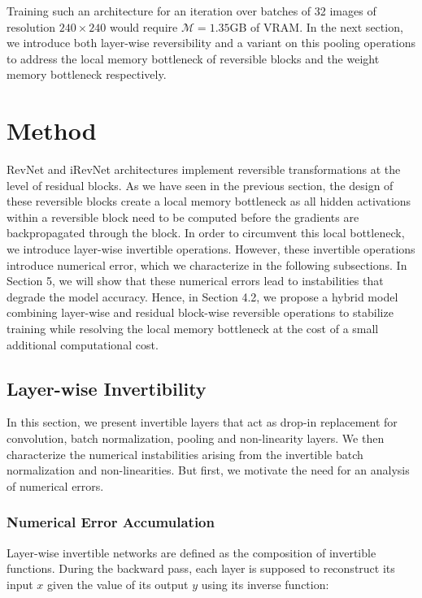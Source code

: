 \documentclass[twocolumn]{bmcart}
\begin{document}
Training such an architecture for an iteration over batches of 32 images of resolution $240 \times 240$ would require $\mathcal{M}=1.35$GB of VRAM.
In the next section, we introduce both layer-wise reversibility and a variant on this pooling operations to address the local memory bottleneck
of reversible blocks and the weight memory bottleneck respectively.

\section{Method}

RevNet and iRevNet architectures implement reversible transformations at the level of residual blocks.
As we have seen in the previous section, the design of these reversible blocks create a local memory bottleneck as all hidden activations within a reversible block need to be computed before the gradients are backpropagated through the block.
In order to circumvent this local bottleneck, we introduce layer-wise invertible operations.
However, these invertible operations introduce numerical error, which we characterize in the following subsections.
In Section 5, we will show that these numerical errors lead to instabilities that degrade the model accuracy.
Hence, in Section 4.2, we propose a hybrid model combining layer-wise and residual block-wise reversible operations to stabilize training while resolving the local memory bottleneck at the cost of a small additional computational cost.


\subsection{Layer-wise Invertibility}

In this section, we present invertible layers that act as drop-in replacement for convolution, batch normalization, pooling and non-linearity layers.
We then characterize the numerical instabilities arising from the invertible batch normalization and non-linearities.
But first, we motivate the need for an analysis of numerical errors.

\subsubsection{Numerical Error Accumulation}

Layer-wise invertible networks are defined as the composition of invertible functions.
During the backward pass, each layer is supposed to reconstruct its input $x$
given the value of its output $y$ using its inverse function:
\end{document}
